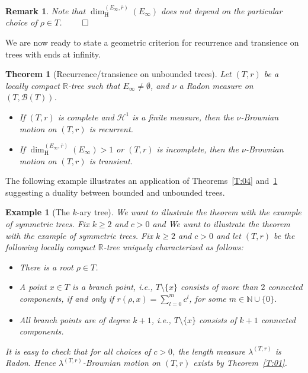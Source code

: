 \documentclass[11pt]{amsart}
\numberwithin{equation}{section}
\newtheorem{theorem}{Theorem}
\newtheorem{example}[definition]{Example}
\newtheorem{remark}[definition]{Remark}
\begin{document}
{\begin{remark}\rm
Note that $\dim_{\mathrm{H}}^{(E_\infty,\overline r)}(E_\infty)$ does not depend on the particular choice of $\rho\in T$.
\label{Rem:08}
\hfill$\qed$
\end{remark}{\smallskip}

We are now ready to  state a geometric criterion for recurrence and transience on trees with ends at infinity.
\begin{theorem}[Recurrence/transience on unbounded trees] {Let $(T,r)$  be a locally compact ${{\mathbb R}}$-tree such that $E_\infty\not = \emptyset$, and $\nu$ a Radon measure on $(T,{\mathcal B}(T))$.}
\label{T:trareha}
\begin{itemize}
\item[(i)] If $(T,r)$ is complete and ${\mathcal H}^1$ is a finite measure,
 then
the $\nu$-Brownian motion on $(T,r)$ is recurrent.
\item[(ii)] If
$\dim_{\mathrm{H}}^{(E_\infty,\overline r)}(E_\infty)>1$ or $(T,r)$ is incomplete, then
the $\nu$-Brownian motion on $(T,r)$ is transient.
\end{itemize}
\end{theorem}{\smallskip}

The following example illustrates an application of Theorems~\ref{T:04} and~\ref{T:trareha}
{suggesting a duality between bounded and unbounded trees}.

\begin{example}[The $k$-ary tree] \rm We want to illustrate the theorem with the example of symmetric trees. Fix $k\ge2$ and $c>0$ and
\label{karrayt}
We want to illustrate the theorem with the example of symmetric trees. Fix $k\ge2$ and $c>0$ and
let $(T,r)$ be the
following locally compact
${{\mathbb R}}$-tree uniquely characterized as follows:
\begin{itemize}
\item
There is a root $\rho\in T$.
\item A point $x\in T$ is a {{\it} branch point}, i.e., $T\setminus\{x\}$ consists of more than $2$
connected components, if and only if
$r(\rho,x)=\sum_{l=0}^mc^{l}$, for some $m\in{{\mathbb N}} \cup \{0\}$.
\item All branch points are of {{\it} degree} $k+1$, i.e., $T\setminus\{x\}$ consists of $k+1$
connected components.
\end{itemize}
It is easy to check that for all choices of $c>0$, the length measure $\lambda^{(T,r)}$ is Radon.
Hence $\lambda^{(T,r)}$-Brownian motion on $(T,r)$
exists by Theorem~\ref{T:01}.


\end{example}}
\end{document}
